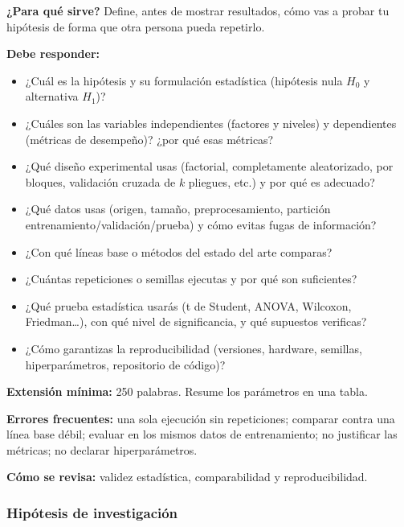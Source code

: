 \begin{guia}
\textbf{¿Para qué sirve?} Define, antes de mostrar resultados, cómo vas a probar tu hipótesis de forma que otra persona
pueda repetirlo.

\textbf{Debe responder:}
\begin{itemize}[nosep,leftmargin=*]
  \item ¿Cuál es la hipótesis y su formulación estadística (hipótesis nula $H_0$ y alternativa $H_1$)?
  \item ¿Cuáles son las variables independientes (factores y niveles) y dependientes (métricas de desempeño)? ¿por qué
        esas métricas?
  \item ¿Qué diseño experimental usas (factorial, completamente aleatorizado, por bloques, validación cruzada de $k$
        pliegues, etc.) y por qué es adecuado?
  \item ¿Qué datos usas (origen, tamaño, preprocesamiento, partición entrenamiento/validación/prueba) y cómo evitas
        fugas de información?
  \item ¿Con qué líneas base o métodos del estado del arte comparas?
  \item ¿Cuántas repeticiones o semillas ejecutas y por qué son suficientes?
  \item ¿Qué prueba estadística usarás (t de Student, ANOVA, Wilcoxon, Friedman\ldots), con qué nivel de significancia, y
        qué supuestos verificas?
  \item ¿Cómo garantizas la reproducibilidad (versiones, hardware, semillas, hiperparámetros, repositorio de código)?
\end{itemize}

\textbf{Extensión mínima:} 250 palabras. Resume los parámetros en una tabla.

\textbf{Errores frecuentes:} una sola ejecución sin repeticiones; comparar contra una línea base débil; evaluar en los
mismos datos de entrenamiento; no justificar las métricas; no declarar hiperparámetros.

\textbf{Cómo se revisa:} validez estadística, comparabilidad y reproducibilidad.
\end{guia}



\subsubsection{Hipótesis de investigación}

